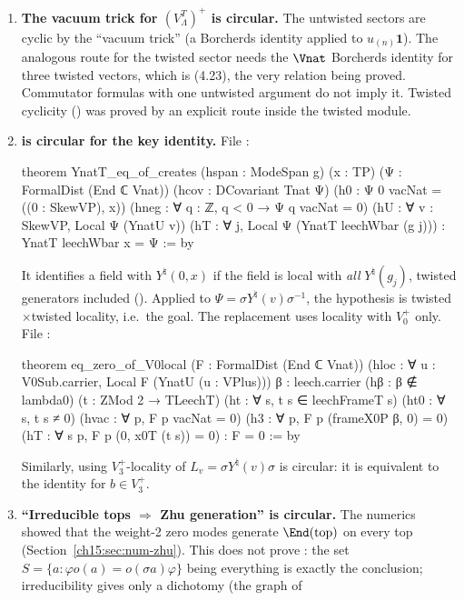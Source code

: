 \begin{enumerate}
\item \textbf{The vacuum trick for $(V_\Lambda^T)^+$ is circular.} The untwisted sectors are cyclic
  by the ``vacuum trick'' (a Borcherds identity applied to $u_{(n)}\mathbf 1$). The analogous route
  for the twisted sector needs the $\Vnat$ Borcherds identity for three twisted vectors, which is
  (4.23), the very relation being proved. Commutator formulas with one untwisted argument do not
  imply it. Twisted cyclicity () was proved by an explicit route inside the
  twisted module.
\item \textbf{ is circular for the key identity.} File
  :
\begin{leancode}
theorem YnatT_eq_of_creates (hspan : ModeSpan g) (x : TP) (Ψ : FormalDist (End ℂ Vnat))
    (hcov : DCovariant Tnat Ψ) (h0 : Ψ 0 vacNat = ((0 : SkewVP), x))
    (hneg : ∀ q : ℤ, q < 0 → Ψ q vacNat = 0) (hU : ∀ v : SkewVP, Local Ψ (YnatU v))
    (hT : ∀ j, Local Ψ (YnatT leechWbar (g j))) : YnatT leechWbar x = Ψ := by
\end{leancode}
  It identifies a field with $Y^\natural(0,x)$ if the field is local with \emph{all} $Y^\natural(g_j)$,
  twisted generators included (). Applied to $\Psi=\sigma Y^\natural(v)\sigma^{-1}$, the
  hypothesis  is twisted$\times$twisted locality, i.e.\ the goal. The replacement uses
  locality with $V_0^+$ only. File :
\begin{leancode}
theorem eq_zero_of_V0local (F : FormalDist (End ℂ Vnat))
    (hloc : ∀ u : V0Sub.carrier, Local F (YnatU (u : VPlus)))
    {β : leech.carrier} (hβ : β ∉ lambda0) (t : ZMod 2 → TLeechT)
    (ht : ∀ s, t s ∈ leechFrameT s) (ht0 : ∀ s, t s ≠ 0)
    (hvac : ∀ p, F p vacNat = 0) (h3 : ∀ p, F p (frameX0P β, 0) = 0)
    (hT : ∀ s p, F p (0, x0T (t s)) = 0) : F = 0 := by
\end{leancode}
  Similarly, using $V_3^+$-locality of $L_v=\sigma Y^\natural(v)\sigma$ is circular: it is equivalent to
  the identity for $b\in V_3^+$.
\item \textbf{``Irreducible tops $\Rightarrow$ Zhu generation'' is circular.} The numerics showed that
  the weight-2 zero modes generate $\End(\mathrm{top})$ on every top (Section~\ref{ch15:sec:num-zhu}).
  This does not prove : the set $S=\{a:\varphi o(a)=o(\sigma a)\varphi\}$ being
  everything is exactly the conclusion; irreducibility gives only a dichotomy (the graph of

\end{enumerate}
